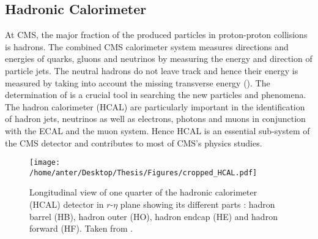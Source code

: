 \subsection{Hadronic Calorimeter}
At CMS, the major fraction of the produced particles in proton-proton collisions is hadrons. The combined CMS calorimeter system measures directions and energies of quarks, gluons and neutrinos by measuring the energy and direction of particle jets. The neutral hadrons do not leave track and hence their energy is measured by taking into account the missing transverse energy (\ETmiss). The determination of \ETmiss is a crucial tool in searching the new particles and phenomena. The hadron calorimeter (HCAL) are particularly important in the identification of hadron jets, neutrinos as well as electrons, photons and muons in conjunction with the ECAL and the muon system. Hence HCAL is an essential sub-system of the CMS detector and contributes to most of CMS's physics studies.
\begin{figure}[!h]
\begin{center}
\vspace*{3mm} 
\hspace*{-5mm}
\texttt{[image: /home/anter/Desktop/Thesis/Figures/cropped\_HCAL.pdf]}\\
\vspace*{4mm}
\caption{Longitudinal view of one quarter of the hadronic calorimeter (HCAL) detector in $r$-$\eta$ plane showing its different parts : hadron barrel (HB), hadron outer (HO), hadron endcap (HE) and hadron forward (HF). Taken from \cite{Chatrchyan:2008aa}.}
\label{fig:hcal}
\end{center}
\end{figure}

